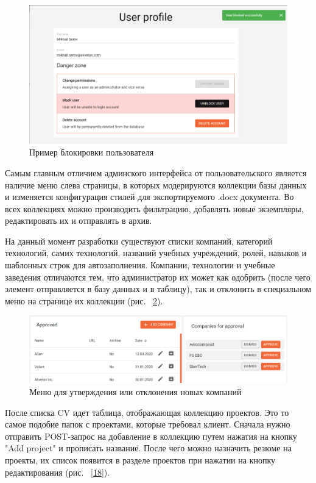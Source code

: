 \documentclass[14pt, a4paper]{diplom}
\begin{document}
\begin{figure}[!ht]
\centering
\includegraphics[width=1\textwidth]{resources/dangerzone.png}
\caption{Пример блокировки пользователя}
\label{16}
\end{figure}

Самым главным отличием админского интерфейса от пользовательского является наличие меню слева страницы, в которых модерируются коллекции базы данных и изменяется конфигурация стилей для экспортируемого .docx документа. Во всех коллекциях можно производить фильтрацию, добавлять новые экземпляры, редактировать их и отправлять в архив.

На данный момент разработки существуют списки компаний, категорий технологий, самих технологий, названий учебных учреждений, ролей, навыков и шаблонных строк для автозаполнения. Компании, технологии и учебные заведения отличаются тем, что администратор их может как одобрить (после чего элемент отправляется в базу данных и в таблицу), так и отклонить в
специальном меню на странице их коллекции (рис. ~\ref{17}).

\begin{figure}[!ht]
\centering
\includegraphics[width=1\textwidth]{resources/companies.png}
\caption{Меню для утверждения или отклонения новых компаний}
\label{17}
\end{figure}
После списка CV идет таблица, отображающая коллекцию проектов. Это то самое подобие папок с проектами, которые требовал клиент. Сначала нужно отправить POST-запрос на добавление в коллекцию
путем нажатия на кнопку "Add project" и прописать название. После чего можно назначить резюме на проекты, их список появится в разделе проектов при нажатии на кнопку редактирования (рис. ~\ref{18}).
\end{document}
